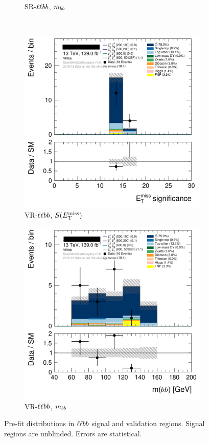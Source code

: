 \begin{figure}[tp]
\begin{subfigure}{0.48\textwidth}
\caption{SR-$\llbb$, $m_{bb}$}
\end{subfigure}
\\[0.5em]
\begin{subfigure}{0.48\textwidth}
\centering
\includegraphics[width=\textwidth]{figures/2ljets_def_met_Sign_VRllbb.png}
\caption{VR-$\llbb$, $S(E_\mathrm{T}^\mathrm{miss})$}
\end{subfigure}
\hfill
\begin{subfigure}{0.48\textwidth}
\centering
\includegraphics[width=\textwidth]{figures/2ljets_def_mbb_VRllbb.png}
\caption{VR-$\llbb$, $m_{bb}$}
\end{subfigure}
\caption[
Pre-fit distributions in $\llbb$ signal and validation regions
]{%
Pre-fit distributions in $\llbb$ signal and validation regions.
Signal regions are unblinded.
Errors are statistical.
}
\label{fig:2ljets_high_llbb_region}
\end{figure}


